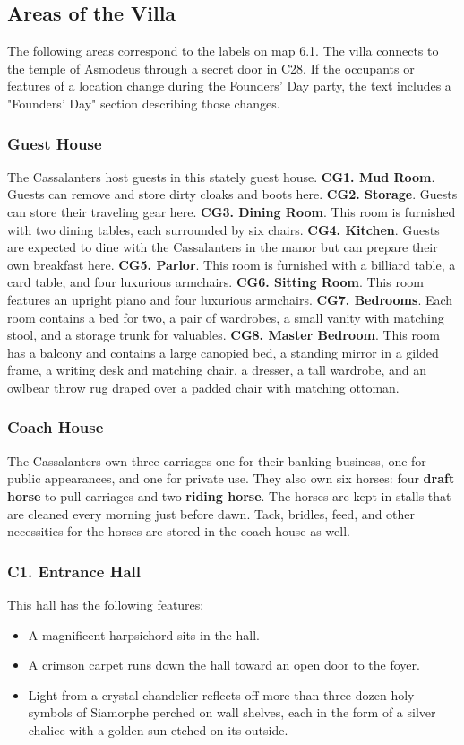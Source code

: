 \documentclass[10pt,a4paper,twoside,twocolumn,openany,nodeprecatedcode]{dndbook}
\begin{document}
\subsection{Areas of the Villa}
The following areas correspond to the labels on map 6.1. The villa connects to the temple of Asmodeus through a secret door in C28.
If the occupants or features of a location change during the Founders' Day party, the text includes a "Founders' Day" section describing those changes.
\subsubsection{Guest House}
The Cassalanters host guests in this stately guest house. \textbf{CG1. Mud Room}. Guests can remove and store dirty cloaks and boots here. \textbf{CG2. Storage}. Guests can store their traveling gear here. \textbf{CG3. Dining Room}. This room is furnished with two dining tables, each surrounded by six chairs. \textbf{CG4. Kitchen}. Guests are expected to dine with the Cassalanters in the manor but can prepare their own breakfast here. \textbf{CG5. Parlor}. This room is furnished with a billiard table, a card table, and four luxurious armchairs. \textbf{CG6. Sitting Room}. This room features an upright piano and four luxurious armchairs. \textbf{CG7. Bedrooms}. Each room contains a bed for two, a pair of wardrobes, a small vanity with matching stool, and a storage trunk for valuables. \textbf{CG8. Master Bedroom}. This room has a balcony and contains a large canopied bed, a standing mirror in a gilded frame, a writing desk and matching chair, a dresser, a tall wardrobe, and an owlbear throw rug draped over a padded chair with matching ottoman.
\subsubsection{Coach House}
The Cassalanters own three carriages-one for their banking business, one for public appearances, and one for private use. They also own six horses: four \textbf{draft horse} to pull carriages and two \textbf{riding horse}. The horses are kept in stalls that are cleaned every morning just before dawn. Tack, bridles, feed, and other necessities for the horses are stored in the coach house as well.
\subsubsection{C1. Entrance Hall}
This hall has the following features:
\begin{itemize}

\item A magnificent harpsichord sits in the hall.
\item A crimson carpet runs down the hall toward an open door to the foyer.
\item Light from a crystal chandelier reflects off more than three dozen holy symbols of Siamorphe perched on wall shelves, each in the form of a silver chalice with a golden sun etched on its outside.
\end{itemize}
\end{document}
